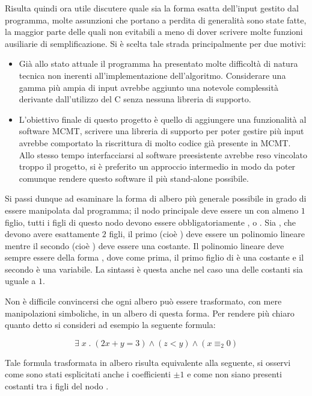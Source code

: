 \documentclass[11pt,letterpaper,twoside]{article}
\begin{document}
Risulta quindi ora utile discutere quale sia la forma esatta dell'input gestito
dal programma, molte assunzioni che portano a perdita di generalità sono state
fatte, la maggior parte delle quali non evitabili a meno di dover scrivere molte
funzioni ausiliarie di semplificazione. Si è scelta tale strada principalmente
per due motivi:

\begin{itemize}
  \item Già allo stato attuale il programma ha presentato molte difficoltà di
    natura tecnica non inerenti all'implementazione dell'algoritmo. Considerare
    una gamma più ampia di input avrebbe aggiunto una notevole complessità
    derivante dall'utilizzo del C senza nessuna libreria di supporto.
  \item L'obiettivo finale di questo progetto è quello di aggiungere una
    funzionalità al software MCMT\autocite{mcmt}, scrivere una libreria di
    supporto per poter gestire più input avrebbe comportato la riscrittura di
    molto codice già presente in MCMT. Allo stesso tempo interfacciarsi al
    software preesistente avrebbe reso vincolato troppo il progetto, si è
    preferito un approccio intermedio in modo da poter comunque rendere questo
    software il più stand-alone possibile.
\end{itemize}

Si passi dunque ad esaminare la forma di albero più generale possibile in grado
di essere manipolata dal programma; il nodo principale deve essere un
 con almeno $1$ figlio, tutti i figli di questo nodo devono essere
obbligatoriamente \inline{=}, \inline{>} o .
Sia \inline{=}, \inline{>} che  devono avere esattamente $2$ figli,
il primo (cioè ) deve essere un polinomio lineare mentre il
secondo (cioè ) deve essere una costante. Il polinomio lineare
deve sempre essere della forma , dove come prima, il primo figlio di \inline{*} è una costante e il
secondo è una variabile. La sintassi è questa anche nel caso una delle
costanti sia uguale a $1$.

Non è difficile convincersi che ogni albero può essere trasformato, con mere
manipolazioni simboliche, in un albero di questa forma. Per rendere più chiaro
quanto detto si consideri ad esempio la seguente formula:

$$ \exists \; x \; . \; (2x + y = 3) \land (z < y) \land (x \equiv_{2} 0) $$

Tale formula trasformata in albero risulta equivalente alla seguente, si osservi
come sono stati esplicitati anche i coefficienti $\pm 1$ e come non siano
presenti costanti tra i figli del nodo \inline{+}.
\end{document}
